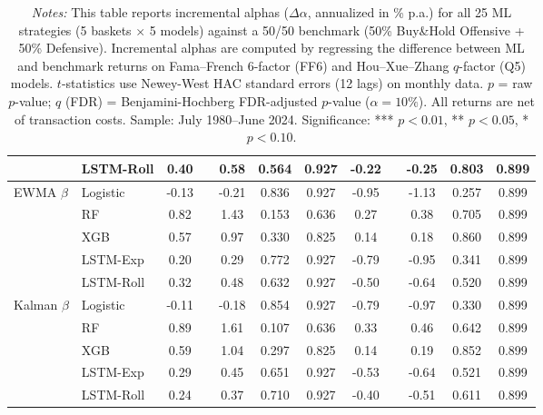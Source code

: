 \begin{table}[htbp]
{\begin{tabular}{l l S[table-format=2.2] l S[table-format=1.2] S[table-format=1.3] S[table-format=1.3] S[table-format=2.2] l S[table-format=1.2] S[table-format=1.3] S[table-format=1.3]}
 & LSTM-Roll & {0.40} &  & {0.58} & 0.564 & 0.927 & {-0.22} &  & {-0.25} & 0.803 & 0.899 \\
\midrule
EWMA $\beta$ & Logistic & {-0.13} &  & {-0.21} & 0.836 & 0.927 & {-0.95} &  & {-1.13} & 0.257 & 0.899 \\
 & RF & {0.82} &  & {1.43} & 0.153 & 0.636 & {0.27} &  & {0.38} & 0.705 & 0.899 \\
 & XGB & {0.57} &  & {0.97} & 0.330 & 0.825 & {0.14} &  & {0.18} & 0.860 & 0.899 \\
 & LSTM-Exp & {0.20} &  & {0.29} & 0.772 & 0.927 & {-0.79} &  & {-0.95} & 0.341 & 0.899 \\
 & LSTM-Roll & {0.32} &  & {0.48} & 0.632 & 0.927 & {-0.50} &  & {-0.64} & 0.520 & 0.899 \\
\midrule
Kalman $\beta$ & Logistic & {-0.11} &  & {-0.18} & 0.854 & 0.927 & {-0.79} &  & {-0.97} & 0.330 & 0.899 \\
 & RF & {0.89} &  & {1.61} & 0.107 & 0.636 & {0.33} &  & {0.46} & 0.642 & 0.899 \\
 & XGB & {0.59} &  & {1.04} & 0.297 & 0.825 & {0.14} &  & {0.19} & 0.852 & 0.899 \\
 & LSTM-Exp & {0.29} &  & {0.45} & 0.651 & 0.927 & {-0.53} &  & {-0.64} & 0.521 & 0.899 \\
 & LSTM-Roll & {0.24} &  & {0.37} & 0.710 & 0.927 & {-0.40} &  & {-0.51} & 0.611 & 0.899 \\
\bottomrule
\end{tabular}%
}
\caption*{\footnotesize \textit{Notes:} This table reports incremental alphas ($\Delta\alpha$, annualized in \% p.a.) for all 25 ML strategies (5 baskets $\times$ 5 models) against a 50/50 benchmark (50\% Buy\&Hold Offensive + 50\% Defensive). Incremental alphas are computed by regressing the difference between ML and benchmark returns on Fama--French 6-factor (FF6) and Hou--Xue--Zhang $q$-factor (Q5) models. $t$-statistics use Newey-West HAC standard errors (12 lags) on monthly data. $p$ = raw $p$-value; $q$ (FDR) = Benjamini-Hochberg FDR-adjusted $p$-value ($\alpha=10\%$). All returns are net of transaction costs. Sample: July 1980--June 2024. Significance: *** $p<0.01$, ** $p<0.05$, * $p<0.10$.}
\end{table}